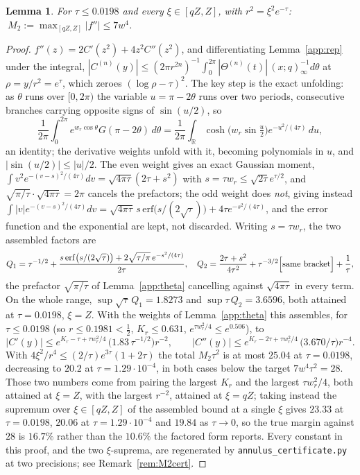 \documentclass[11pt]{article}
\theoremstyle{plain}
\newtheorem{lemma}[theorem]{Lemma}
\theoremstyle{definition}
\theoremstyle{remark}
\newcommand{\R}{\mathbb{R}}
\begin{document}
\begin{lemma}\label{app:M2}
For $\tau\le0.0198$ and every $\xi\in[qZ,Z]$, with $r^2=\xi^2e^{-\tau}$:
$\ M_2:=\max_{[qZ,Z]}|f''|\le7w^4$.
\end{lemma}

\begin{proof}
$f''(z)=2C'(z^2)+4z^2C''(z^2)$, and differentiating Lemma~\ref{app:rep} under the integral,
$|C^{(n)}(y)|\le(2\pi r^{2n})^{-1}\int_0^{2\pi}|\Theta^{(n)}(t)|\,(x;q)_\infty^{-1}d\theta$ at
$\rho=y/r^2=e^\tau$, which zeroes $(\log\rho-\tau)^2$. The key step is the exact unfolding: as
$\theta$ runs over $[0,2\pi)$ the variable $u=\pi-2\theta$ runs over two periods, consecutive
branches carrying opposite signs of $\sin(u/2)$, so
\[
 \frac1{2\pi}\int_0^{2\pi}e^{w_r\cos\theta}G(\pi-2\theta)\,d\theta
 =\frac1{2\pi}\int_{\R}\cosh\bigl(w_r\sin\tfrac u2\bigr)e^{-u^2/(4\tau)}\,du ,
\]
an identity; the derivative weights unfold with it, becoming polynomials in $u$, and
$|\sin(u/2)|\le|u|/2$. The even weight gives an exact Gaussian moment,
$\int v^2e^{-(v-s)^2/(4\tau)}dv=\sqrt{4\pi\tau}(2\tau+s^2)$ with $s=\tau w_r\le\sqrt{2\tau}e^{\tau/2}$,
and $\sqrt{\pi/\tau}\cdot\sqrt{4\pi\tau}=2\pi$ cancels the prefactors; the odd weight does
\emph{not}, giving instead
$\int|v|e^{-(v-s)^2/(4\tau)}dv=\sqrt{4\pi\tau}\,s\,\mathrm{erf}\bigl(s/(2\sqrt\tau)\bigr)
+4\tau e^{-s^2/(4\tau)}$, and the error function and the exponential are kept, not discarded.
Writing $s=\tau w_r$, the two assembled factors are
\[
 Q_1=\tau^{-1/2}+\frac{s\,\mathrm{erf}\bigl(s/(2\sqrt\tau)\bigr)+2\sqrt{\tau/\pi}\,e^{-s^2/(4\tau)}}{2\tau},
 \quad
 Q_2=\frac{2\tau+s^2}{4\tau^2}+\tau^{-3/2}\Bigl[\text{same bracket}\Bigr]+\frac1\tau ,
\]
the prefactor $\sqrt{\pi/\tau}$ of Lemma~\ref{app:theta} cancelling against $\sqrt{4\pi\tau}$ in
every term. On the whole range, $\sup\sqrt\tau\,Q_1=1.8273$ and $\sup\tau\,Q_2=3.6596$, both
attained at $\tau=0.0198$, $\xi=Z$. With the weights of
Lemma~\ref{app:theta} this assembles, for $\tau\le0.0198$ (so $r\le0.1981<\tfrac12$, $K_r\le0.631$,
$e^{\tau w_r^2/4}\le e^{0.506}$), to
\[
 |C'(y)|\le e^{K_r-\tau+\tau w_r^2/4}\,\bigl(1.83\,\tau^{-1/2}\bigr)r^{-2},\qquad
 |C''(y)|\le e^{K_r-2\tau+\tau w_r^2/4}\,\bigl(3.670/\tau\bigr)r^{-4}.
\]
With $4\xi^2/r^4\le(2/\tau)e^{3\tau}(1+2\tau)$ the total $M_2\tau^2$ is at most $25.04$ at
$\tau=0.0198$, decreasing to $20.2$ at $\tau=1.29\cdot10^{-4}$, in both cases below the target
$7w^4\tau^2=28$. Those two numbers come from pairing the largest $K_r$ and the largest
$\tau w_r^2/4$, both attained at $\xi=Z$, with the largest $r^{-2}$, attained at $\xi=qZ$; taking
instead the supremum over $\xi\in[qZ,Z]$ of the assembled bound at a single $\xi$ gives $23.33$ at
$\tau=0.0198$, $20.06$ at $\tau=1.29\cdot10^{-4}$ and $19.84$ as $\tau\to0$, so the true margin
against $28$ is $16.7\%$ rather than the $10.6\%$ the factored form reports. Every constant in this
proof, and the two $\xi$-suprema, are regenerated by \texttt{annulus\_certificate.py} at two
precisions; see Remark~\ref{rem:M2cert}.
\end{proof}
\end{document}
